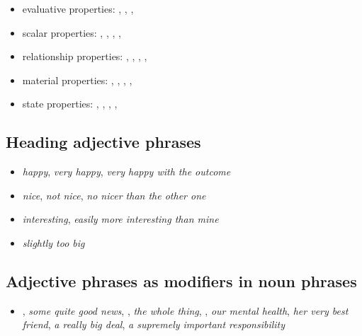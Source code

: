 \begin{itemize}[noitemsep]
    \item evaluative properties: , , , 
    \item scalar properties: , , , , 
    \item relationship properties: , , , , 
    \item material properties: , , , , 
    \item state properties: , , , , 
\end{itemize}

\subsection{Heading adjective phrases}
\begin{itemize}[noitemsep]
    \item \textit{\emph{happy}}, \textit{very \emph{happy}}, \textit{very \emph{happy} with the outcome}
    \item \textit{\emph{nice}}, \textit{not \emph{nice}}, \textit{no \emph{nicer} than the other one}
    \item \textit{\emph{interesting}}, \textit{easily more \emph{interesting} than mine}
    \item \textit{slightly too \emph{big}}
\end{itemize}

\subsection{Adjective phrases as modifiers in noun phrases}
\begin{itemize}[noitemsep]
    \item \emph{} , \textit{some \emph{quite good} news},  \emph{} , \textit{the \emph{whole} thing}, \emph{} , \textit{our \emph{mental} health}, \textit{her \emph{very best} friend}, \textit{a \emph{really big} deal}, \textit{a \emph{supremely important} responsibility}
\end{itemize}


